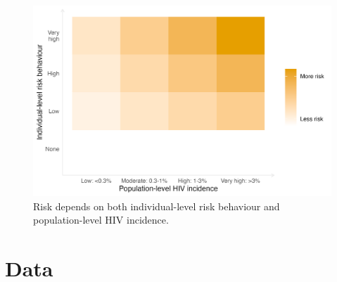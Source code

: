 \documentclass[a4paper, nobind]{templates/ociamthesis}
\begin{document}
\begin{figure}

{\centering \includegraphics[width=0.95\linewidth]{figures/multi-agyw/risk-grid} 

}

\caption{Risk depends on both individual-level risk behaviour and population-level HIV incidence.}\label{fig:risk-grid}
\end{figure}

\hypertarget{data}{%
\section{Data}\label{data}}
\end{document}
